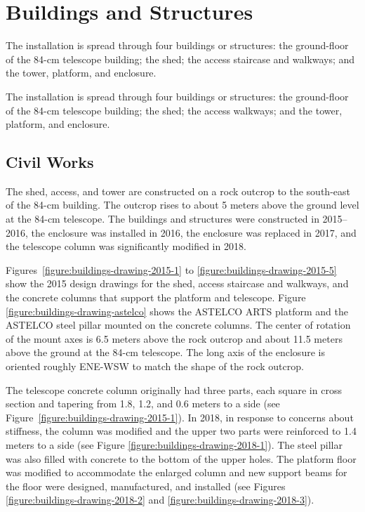 \chapter{Buildings and Structures}
\label{chapter:buildings}

\ifcoatlioan

The {\projectname} installation is spread through four buildings or structures: the ground-floor of the 84-cm telescope building; the shed; the access staircase and walkways; and the tower, platform, and enclosure. 

\fi

\ifddotioan

The {\projectname} installation is spread through four buildings or structures: the ground-floor of the 84-cm telescope building; the shed; the access walkways; and the tower, platform, and enclosure.

\fi

\section{Civil Works}

\ifcoatlioan

The shed, access, and tower are constructed on a rock outcrop to the south-east of the 84-cm building. The outcrop rises to about 5 meters above the ground level at the 84-cm telescope. The buildings and structures were constructed in 2015--2016, the enclosure was installed in 2016, the enclosure was replaced in 2017, and the telescope column was significantly modified in 2018.

Figures~\ref{figure:buildings-drawing-2015-1} to \ref{figure:buildings-drawing-2015-5} show the 2015 design drawings for the shed, access staircase and walkways, and the concrete columns that support the platform and telescope. Figure  \ref{figure:buildings-drawing-astelco} shows the ASTELCO ARTS platform and the ASTELCO steel pillar mounted on the concrete columns. The center of rotation of the mount axes is 6.5 meters above the rock outcrop and about 11.5 meters above the ground at the 84-cm telescope. The long axis of the enclosure is oriented roughly ENE-WSW to match the shape of the rock outcrop.

The telescope concrete column originally had three parts, each square in cross section and tapering from 1.8, 1.2, and 0.6 meters to a side (see Figure~\ref{figure:buildings-drawing-2015-1}). In 2018, in response to concerns about stiffness, the column was modified and the upper two parts were reinforced to 1.4 meters to a side (see Figure \ref{figure:buildings-drawing-2018-1}). The steel pillar was also filled with concrete to the bottom of the upper holes. The platform floor was modified to accommodate the enlarged column and new support beams for the floor were designed, manufactured, and installed (see Figures \ref{figure:buildings-drawing-2018-2} and \ref{figure:buildings-drawing-2018-3}).

